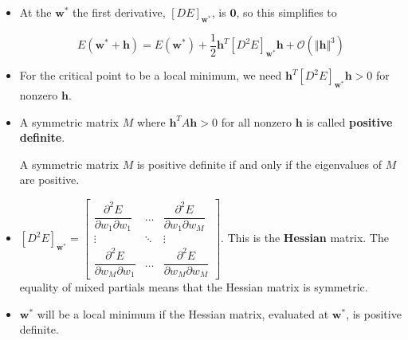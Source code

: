 \documentclass[12pt,letterpaper,noanswers]{exam}
\newcommand{\vc}[1]{\boldsymbol{#1}}
\begin{document}
    \begin{tcolorbox}
    \begin{itemize}
  \item  
    At the $\vc{w}^*$ the first derivative, $\left[DE\right]_{\vc{w}^*}$, is $\vc{0}$, so this simplifies to 
    
    \[E(\vc{w}^*+\vc{h}) = E(\vc{w}^*) +  \frac{1}{2} \vc{h}^T\left[D^2E\right]_{\vc{w}^*}\vc{h} + \mathcal{O}(\Vert\vc{h}\Vert^3)\]
    
    \item For the critical point to be a local minimum, we need $\vc{h}^T\left[D^2E\right]_{\vc{w}^*}\vc{h}>0$ for nonzero $\vc{h}$. 
    \end{itemize}
\end{tcolorbox}

\begin{tcolorbox}
    \begin{itemize}
    \item A symmetric matrix $M$ where $\vc{h}^TA\vc{h}>0$ for all nonzero $\vc{h}$ is called \textbf{positive definite}.
    
    A symmetric matrix $M$ is positive definite if and only if the eigenvalues of $M$ are positive.
    
    \item $\left[D^2E\right]_{\vc{w}^*} = \left[\begin{array}{ccc}
    \dfrac{\partial^2E}{\partial w_1 \partial w_1} & \hdots & \dfrac{\partial^2E}{\partial w_1 \partial w_M} \\
    \vdots & \ddots & \vdots \\
    
    \dfrac{\partial^2E}{\partial w_M \partial w_1} & \hdots & \dfrac{\partial^2E}{\partial w_M \partial w_M}
    \end{array}\right]$. This is the \textbf{Hessian} matrix.  The equality of mixed partials means that the Hessian matrix is symmetric.
    \item $\vc{w}^*$ will be a local minimum if the Hessian matrix, evaluated at $\vc{w}^*$, is positive definite.
\end{itemize}
\end{tcolorbox}
\end{document}
